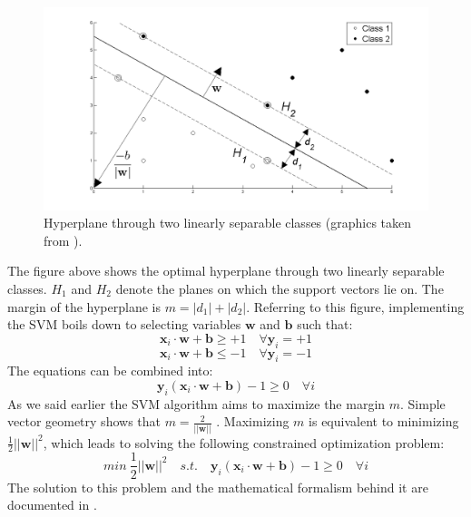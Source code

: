 \documentclass[a4paper,11pt,oneside]{article}
\begin{document}
\begin{figure}[H]
  \includegraphics[scale=0.3]{hyperplane}
  \centering
  \caption{Hyperplane through two linearly separable classes (graphics taken from \cite{fletcher2009support}).}
\end{figure}
The figure above shows the optimal hyperplane through two linearly separable classes. 
$H_1$ and $H_2$ denote the planes on which the support vectors lie on. 
The margin of the hyperplane is $m = |d_1|+|d_2|$. Referring to this figure, implementing the SVM boils down to selecting
variables $\mathbf{w}$ and $\mathbf{b}$ such that:
\begin{equation}\label{svm1}
  \mathbf{x}_i\cdot\mathbf{w}+\mathbf{b}\geq +1 \quad \forall \mathbf{y}_i = +1
\end{equation}
\begin{equation}\label{svm2}
  \mathbf{x}_i\cdot\mathbf{w}+\mathbf{b}\leq -1 \quad \forall \mathbf{y}_i = -1
\end{equation}
The equations can be combined into:
\begin{equation}\label{svm3}
  \mathbf{y}_i(\mathbf{x}_i\cdot\mathbf{w}+\mathbf{b}) - 1 \geq 0 \quad \forall i
\end{equation}
As we said earlier the SVM algorithm aims to maximize the margin $m$. Simple vector geometry
shows that $m = \frac{2}{||\mathbf{w}||}$ \cite{fletcher2009support}. Maximizing $m$ is equivalent to minimizing
$\frac{1}{2}||\mathbf{w}||^2$, which leads to solving the following constrained optimization problem:
\begin{equation}\label{primal}
  min \ \frac{1}{2}||\mathbf{w}||^2 \quad s.t. \quad  \mathbf{y}_i(\mathbf{x}_i\cdot\mathbf{w}+\mathbf{b}) - 1 \geq 0 \quad \forall i
\end{equation}
The solution to this problem and the mathematical formalism behind it are documented in \cite{law2006simple}.
\end{document}
